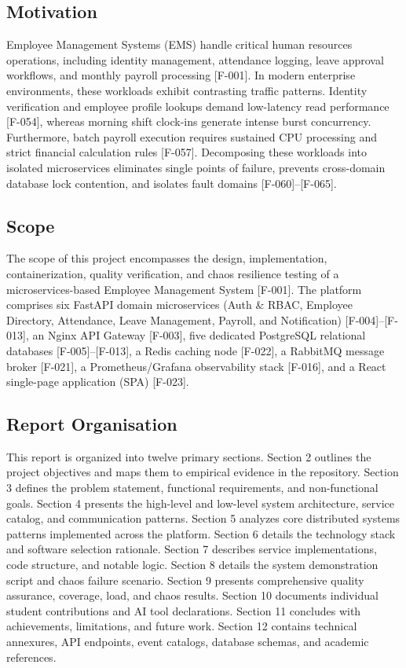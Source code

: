 \documentclass[11pt,a4paper]{article}
\begin{document}
\subsection{Motivation}
Employee Management Systems (EMS) handle critical human resources operations, including identity management, attendance logging, leave approval workflows, and monthly payroll processing [F-001]. In modern enterprise environments, these workloads exhibit contrasting traffic patterns. Identity verification and employee profile lookups demand low-latency read performance [F-054], whereas morning shift clock-ins generate intense burst concurrency. Furthermore, batch payroll execution requires sustained CPU processing and strict financial calculation rules [F-057]. Decomposing these workloads into isolated microservices eliminates single points of failure, prevents cross-domain database lock contention, and isolates fault domains [F-060]--[F-065].

\subsection{Scope}
The scope of this project encompasses the design, implementation, containerization, quality verification, and chaos resilience testing of a microservices-based Employee Management System [F-001]. The platform comprises six FastAPI domain microservices (Auth \& RBAC, Employee Directory, Attendance, Leave Management, Payroll, and Notification) [F-004]--[F-013], an Nginx API Gateway [F-003], five dedicated PostgreSQL relational databases [F-005]--[F-013], a Redis caching node [F-022], a RabbitMQ message broker [F-021], a Prometheus/Grafana observability stack [F-016], and a React single-page application (SPA) [F-023].

\subsection{Report Organisation}
This report is organized into twelve primary sections. Section 2 outlines the project objectives and maps them to empirical evidence in the repository. Section 3 defines the problem statement, functional requirements, and non-functional goals. Section 4 presents the high-level and low-level system architecture, service catalog, and communication patterns. Section 5 analyzes core distributed systems patterns implemented across the platform. Section 6 details the technology stack and software selection rationale. Section 7 describes service implementations, code structure, and notable logic. Section 8 details the system demonstration script and chaos failure scenario. Section 9 presents comprehensive quality assurance, coverage, load, and chaos results. Section 10 documents individual student contributions and AI tool declarations. Section 11 concludes with achievements, limitations, and future work. Section 12 contains technical annexures, API endpoints, event catalogs, database schemas, and academic references.
\end{document}
